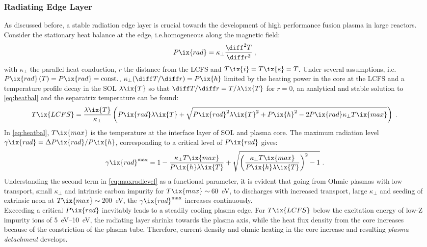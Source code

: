             \subsubsection*{Radiating Edge Layer}%
%
                As discussed before, a stable radiation edge layer is crucial towards the development of high performance fusion plasma in large reactors. Consider the stationary heat balance at the edge, i.e.homogeneous along the magnetic field:
%
                \begin{align}%
                    P\ix{rad}=\kappa_{\perp}\frac{\diff^{2}T}{\diff r^{2}}\,\,,\label{eq:heatbal}%
                \end{align}%
%
                with $\kappa_{\perp}$ the parallel heat conduction, $r$ the distance from the LCFS and $T\ix{i}=T\ix{e}=T$\cite{Tokar2010}. Under several assumptions, i.e. $P\ix{rad}\left(T\right)=P\ix{rad}=\text{const.}$, $\kappa_{\perp}(\diff T/\diff r)=P\ix{h}$ limited by the heating power in the core at the LCFS and a temperature profile decay in the SOL $\lambda\ix{T}$ so that $\diff T/\diff r=T/\lambda\ix{T}$ for $r=0$, an analytical and stable solution to \cref{eq:heatbal} and the separatrix temperature can be found:%
%
                \begin{align}%
                    T\ix{LCFS}=\frac{\lambda\ix{T}}{\kappa_{\perp}}\left(P\ix{rad}\lambda\ix{T}+\sqrt{P\ix{rad}^{2}\lambda\ix{T}^{2}+P\ix{h}^{2}-2P\ix{rad}\kappa_{\perp}T\ix{max}}\right)\,\,.\label{eq:septemp}%
                \end{align}%
%
                In \ref{eq:heatbal}, $T\ix{max}$ is the temperature at the interface layer of SOL and plasma core. The maximum radiation level $\gamma\ix{rad}=\Delta P\ix{rad}/P\ix{h}$, corresponding to a critical level of $P\ix{rad}$ gives\cite{Tokar2010}:%
%
                \begin{align}%
                    \gamma\ix{rad}^{\text{max}}=1-\frac{\kappa_{\perp}T\ix{max}}{P\ix{h}\lambda\ix{T}}+\sqrt{\left(\frac{\kappa_{\perp}T\ix{max}}{P\ix{h}\lambda\ix{T}}\right)^{2}-1}\,\,.\label{eq:maxradlevel}%
                \end{align}%
%
                Understanding the second term in \cref{eq:maxradlevel} as a functional parameter, it is evident that going from Ohmic plasmas with low transport, small $\kappa_{\perp}$ and intrinsic carbon impurity for $T\ix{max}\sim\,$\SI{60}{\electronvolt}, to discharges with increased transport, large $\kappa_{\perp}$ and seeding of extrinsic neon at $T\ix{max}\sim\,$\SI{200}{\electronvolt}, the $\gamma\ix{rad}^{\text{max}}$ increases continuously\cite{Garcia2006,Samm1993,Karzas1961}.\\%
                Exceeding a critical $P\ix{rad}$ inevitably leads to a steadily cooling plasma edge. For $T\ix{LCFS}$ below the excitation energy of low-Z impurity ions of \SIrange{5}{10}{\electronvolt}, the radiating layer shrinks towards the plasma axis, while the heat flux density from the core increases because of the constriction of the plasma tube. Therefore, current density and ohmic heating in the core increase and resulting \textit{plasma detachment} develops\cite{Tokar2010}.%
%
